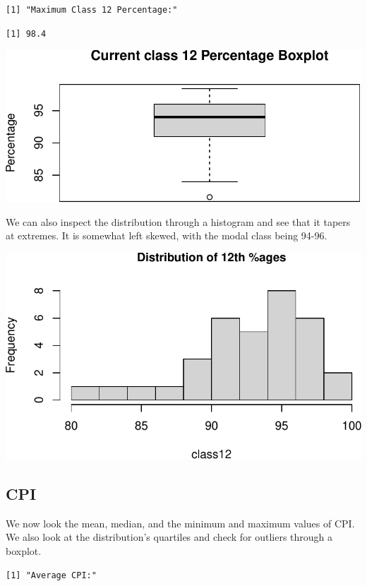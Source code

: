 \documentclass[
  letterpaper,
  DIV=11,
  numbers=noendperiod]{scrartcl}
\begin{document}
\begin{verbatim}
[1] "Maximum Class 12 Percentage:"
\end{verbatim}

\begin{verbatim}
[1] 98.4
\end{verbatim}

\includegraphics{Question1_files/figure-pdf/unnamed-chunk-4-1.pdf}

We can also inspect the distribution through a histogram and see that it
tapers at extremes. It is somewhat left skewed, with the modal class
being 94-96.

\includegraphics{Question1_files/figure-pdf/unnamed-chunk-5-1.pdf}

\hypertarget{cpi}{%
\subsection{CPI}\label{cpi}}

We now look the mean, median, and the minimum and maximum values of CPI.
We also look at the distribution's quartiles and check for outliers
through a boxplot.

\begin{verbatim}
[1] "Average CPI:"
\end{verbatim}
\end{document}
